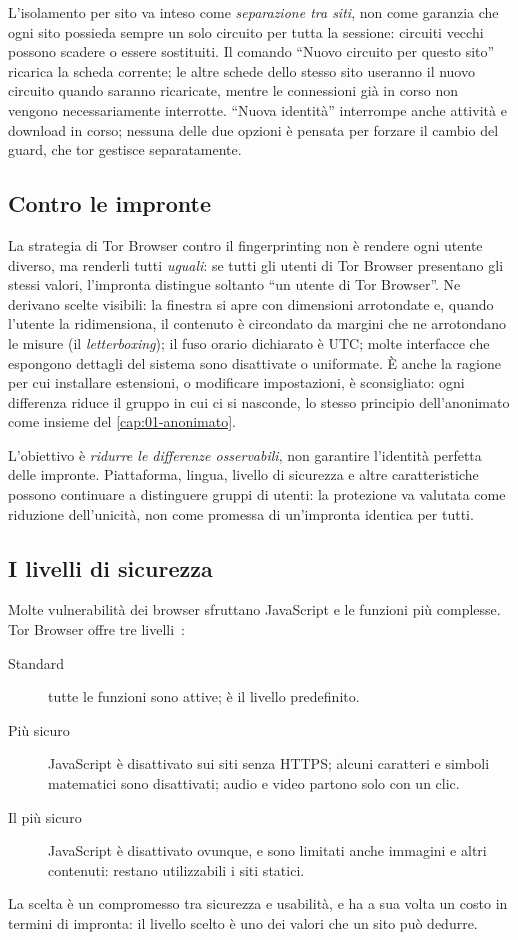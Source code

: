 L'isolamento per sito va inteso come \emph{separazione tra siti}, non come garanzia che ogni sito possieda sempre un solo circuito per tutta la sessione: circuiti vecchi possono scadere o essere sostituiti. Il comando \enquote{Nuovo circuito per questo sito} ricarica la scheda corrente; le altre schede dello stesso sito useranno il nuovo circuito quando saranno ricaricate, mentre le connessioni già in corso non vengono necessariamente interrotte. \enquote{Nuova identità} interrompe anche attività e download in corso; nessuna delle due opzioni è pensata per forzare il cambio del guard, che tor gestisce separatamente.

\subsection{Contro le impronte}

La strategia di Tor Browser contro il fingerprinting non è rendere ogni utente diverso, ma renderli tutti \emph{uguali}: se tutti gli utenti di Tor Browser presentano gli stessi valori, l'impronta distingue soltanto \enquote{un utente di Tor Browser}. Ne derivano scelte visibili: la finestra si apre con dimensioni arrotondate e, quando l'utente la ridimensiona, il contenuto è circondato da margini che ne arrotondano le misure (il \emph{letterboxing}); il fuso orario dichiarato è UTC; molte interfacce che espongono dettagli del sistema sono disattivate o uniformate. È anche la ragione per cui installare estensioni, o modificare impostazioni, è sconsigliato: ogni differenza riduce il gruppo in cui ci si nasconde, lo stesso principio dell'anonimato come insieme del \cref{cap:01-anonimato}.

L'obiettivo è \emph{ridurre le differenze osservabili}, non garantire l'identità perfetta delle impronte. Piattaforma, lingua, livello di sicurezza e altre caratteristiche possono continuare a distinguere gruppi di utenti: la protezione va valutata come riduzione dell'unicità, non come promessa di un'impronta identica per tutti.

\subsection{I livelli di sicurezza}

Molte vulnerabilità dei browser sfruttano JavaScript e le funzioni più complesse. Tor Browser offre tre livelli~\cite{tbmanual}:
\begin{description}
  \item[Standard] tutte le funzioni sono attive; è il livello predefinito.
  \item[Più sicuro] JavaScript è disattivato sui siti senza HTTPS; alcuni caratteri e simboli matematici sono disattivati; audio e video partono solo con un clic.
  \item[Il più sicuro] JavaScript è disattivato ovunque, e sono limitati anche immagini e altri contenuti: restano utilizzabili i siti statici.
\end{description}
La scelta è un compromesso tra sicurezza e usabilità, e ha a sua volta un costo in termini di impronta: il livello scelto è uno dei valori che un sito può dedurre.

